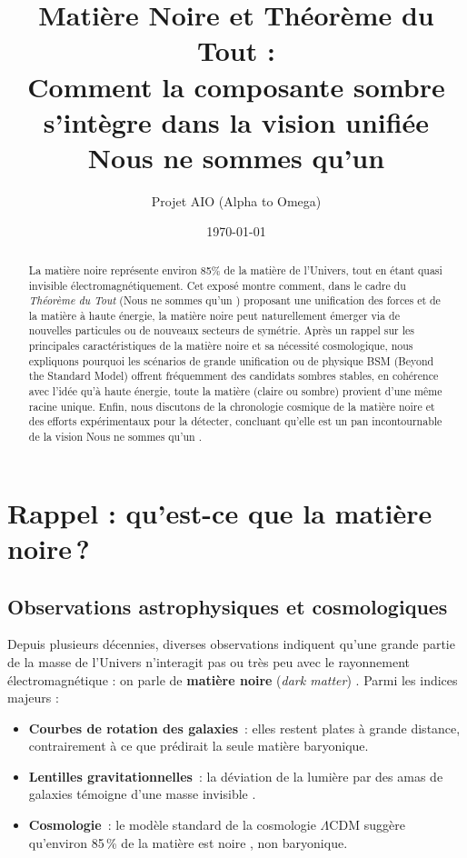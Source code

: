 \documentclass[12pt]{article}
\title{\textbf{Matière Noire et Théorème du Tout :}\\
Comment la composante sombre s'intègre dans la vision unifiée \\
\og Nous ne sommes qu’un \fg}
\author{Projet AIO (Alpha to Omega)}
\date{\today}
\begin{document}
\maketitle

\begin{abstract}
La matière noire représente environ 85\% de la matière de l'Univers, tout en étant quasi invisible électromagnétiquement. Cet exposé montre comment, dans le cadre du \emph{Théorème du Tout} (\og Nous ne sommes qu’un \fg) proposant une unification des forces et de la matière à haute énergie, la matière noire peut naturellement émerger via de nouvelles particules ou de nouveaux secteurs de symétrie. Après un rappel sur les principales caractéristiques de la matière noire et sa nécessité cosmologique, nous expliquons pourquoi les scénarios de grande unification ou de physique BSM (Beyond the Standard Model) offrent fréquemment des candidats sombres stables, en cohérence avec l’idée qu’à haute énergie, toute la matière (claire ou sombre) provient d’une même racine unique. Enfin, nous discutons de la chronologie cosmique de la matière noire et des efforts expérimentaux pour la détecter, concluant qu’elle est un pan incontournable de la vision \og Nous ne sommes qu’un \fg.
\end{abstract}

\tableofcontents

\section{Rappel : qu’est-ce que la matière noire\,?}
\label{sec:rappel}

\subsection{Observations astrophysiques et cosmologiques}

Depuis plusieurs décennies, diverses observations indiquent qu’une grande partie de la masse de l’Univers n’interagit pas ou très peu avec le rayonnement électromagnétique : on parle de \textbf{matière noire} (\emph{dark matter}) \cite{zwicky1933rotational, rubin1980rotational, planck2018}. Parmi les indices majeurs :

\begin{itemize}
  \item \textbf{Courbes de rotation des galaxies}~: elles restent plates à grande distance, contrairement à ce que prédirait la seule matière baryonique.
  \item \textbf{Lentilles gravitationnelles}~: la déviation de la lumière par des amas de galaxies témoigne d’une masse \og invisible \fg.
  \item \textbf{Cosmologie}~: le modèle standard de la cosmologie \(\Lambda \mathrm{CDM}\) suggère qu’environ 85\,\% de la matière est \og noire \fg, non baryonique.
\end{itemize}
\end{document}
